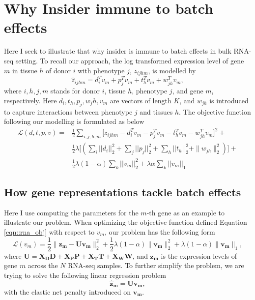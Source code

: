\documentclass[10]{article}
\begin{document}
\section{Why Insider immune to batch effects}
Here I seek to illustrate that why insider is immune to batch effects in bulk RNA-seq setting. To recall our approach, the log transformed expression level of gene $m$ in tissue $h$ of donor $i$ with phenotype $j$, $z_{ijhm}$, is modelled by
  \begin{equation}
    \label{eqn::rna_seq}
    \hat{z}_{ijhm} = d_i^T v_m + p_j^T v_m + t_h^T v_m + w_{jh}^T v_m,
  \end{equation}
  where $i, h, j, m$ stands for donor $i$, tissue $h$, phenotype $j$, and gene $m$, respectively. Here $d_i, t_h, p_j, w_jh, v_m$ are vectors of length $K$, and  $w_{jh}$ is introduced to capture interactions between phenotype $j$ and tissues $h$. The objective function following our modelling is formulated as below
  \begin{equation}
  \label{eqn::rna_obj}
    \begin{split}
      \mathcal{L}(d, t, p, v) = & \frac{1}{2} \sum_{i,j,h,m} \bigg [z_{ijhm} - d_i^T v_m - p_j^T v_m - t_h^T v_m - w_{jh}^T v_m \bigg]^2 + \\ 
      & \frac{1}{2}  \lambda \bigg [ (\sum_i ||d_i||_2^2 + \sum_j ||p_j||_2^2 + \sum_h ||t_h||_2^2 + \|w_{jh}\|_2^2 ) \bigg] + \\
      & \frac{1}{2} \lambda (1 - \alpha) \sum_k ||v_m||_2^2 + \lambda \alpha \sum_k ||v_m||_1
    \end{split}
  \end{equation}

  \subsection{How gene representations tackle batch effects}
    Here I use computing the parameters for the $m$-th gene as an example to illustrate our problem. When optimizing the objective function defined Equation \ref{eqn::rna_obj} with respect to $v_m$, our problem has the following form
    \begin{equation}
      \label{eqn::elastic_net}
      \mathcal{L}(v_m) = \frac{1}{2} \|\mathbf{z_m} - \mathbf{U v_m}\|_2^2 + \frac{1}{2} \lambda (1 - \alpha) \|\mathbf{v_m}\|_2^2 + \lambda (1 - \alpha) \|\mathbf{v_m}\|_1,
    \end{equation}
    where $\mathbf{U} = \mathbf{X_D D} + \mathbf{X_P P} + \mathbf{X_T T} + \mathbf{X_W W}$, and $\mathbf{z_m}$ is the expression levels of gene $m$ across the $N$ RNA-seq samples. To further simplify the problem, we are trying to solve the following linear regression problem
    \begin{equation*}
      \mathbf{\hat{z}_m} = \mathbf{U} \mathbf{v_m},
    \end{equation*}
    with the elastic net penalty introduced on $\mathbf{v_m}$. 
\end{document}
